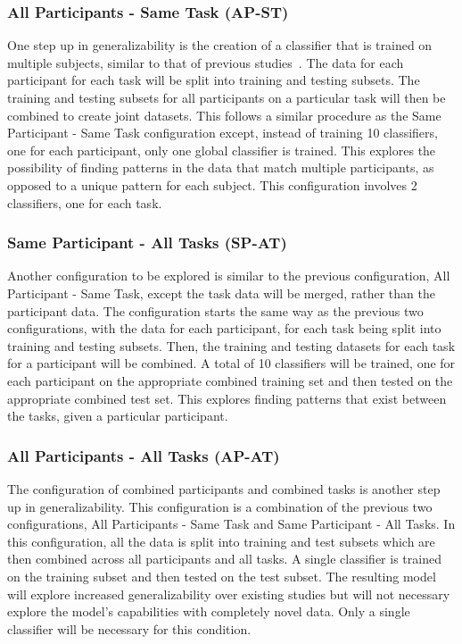 \documentclass[11pt]{article}
\begin{document}
\subsubsection{All Participants - Same Task (AP-ST)}
One step up in generalizability is the creation of a classifier that is trained on multiple subjects, similar to that of previous studies~\cite{Wang_Z}. The data for each participant for each task will be split into training and testing subsets. The training and testing subsets for all participants on a particular task will then be combined to create joint datasets. This follows a similar procedure as the Same Participant - Same Task configuration except, instead of training 10 classifiers, one for each participant, only one global classifier is trained. This explores the possibility of finding patterns in the data that match multiple participants, as opposed to a unique pattern for each subject. This configuration involves 2 classifiers, one for each task.


\subsubsection{Same Participant - All Tasks (SP-AT)}
Another configuration to be explored is similar to the previous configuration, All Participant - Same Task, except the task data will be merged, rather than the participant data. The configuration starts the same way as the previous two configurations, with the data for each participant, for each task being split into training and testing subsets. Then, the training and testing datasets for each task for a participant will be combined. A total of 10 classifiers will be trained, one for each participant on the appropriate combined training set and then tested on the appropriate combined test set. This explores finding patterns that exist between the tasks, given a particular participant.

\subsubsection{All Participants - All Tasks (AP-AT)}
The configuration of combined participants and combined tasks is another step up in generalizability. This configuration is a combination of the previous two configurations, All Participants - Same Task and Same Participant - All Tasks. In this configuration, all the data is split into training and test subsets which are then combined across all participants and all tasks. A single classifier is trained on the training subset and then tested on the test subset. The resulting model will explore increased generalizability over existing studies but will not necessary explore the model's capabilities with completely novel data. Only a single classifier will be necessary for this condition.
\end{document}
